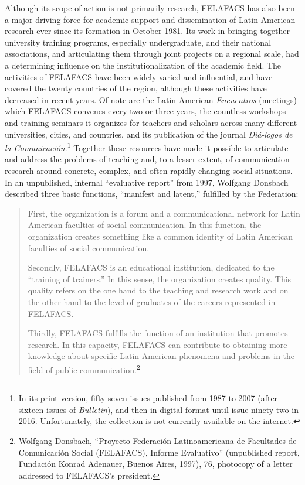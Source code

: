 \documentclass{tufte-handout}
\begin{document}
Although its scope of action is not primarily research, FELAFACS has
also been a major driving force for academic support and dissemination
of Latin American research ever since its formation in October 1981. Its
work in bringing together university training programs, especially
undergraduate, and their national associations, and articulating them
through joint projects on a regional scale, had a determining influence
on the institutionalization of the academic field. The activities of
FELAFACS have been widely varied and influential, and have covered the
twenty countries of the region, although these activities have decreased
in recent years. Of note are the Latin American \emph{Encuentros}
(meetings) which FELAFACS convenes every two or three years, the
countless workshops and training seminars it organizes for teachers and
scholars across many different universities, cities, and countries, and
its publication of the journal \emph{Diá-logos de la
Comunicación}.\footnote{In its print version, fifty-seven issues
  published from 1987 to 2007 (after sixteen issues of \emph{Bulletin}),
  and then in digital format until issue ninety-two in 2016.
  Unfortunately, the collection is not currently available on the
  internet.} Together these resources have made it possible to
articulate and address the problems of teaching and, to a lesser extent,
of communication research around concrete, complex, and often rapidly
changing social situations. In an unpublished, internal ``evaluative
report'' from 1997, Wolfgang Donsbach described three basic functions,
``manifest and latent,'' fulfilled by the Federation:

\begin{quote}
First, the organization is a forum and a communicational network for
Latin American faculties of social communication. In this function, the
organization creates something like a common identity of Latin American
faculties of social communication.

Secondly, FELAFACS is an educational institution, dedicated to the
``training of trainers.'' In this sense, the organization creates
quality. This quality refers on the one hand to the teaching and
research work and on the other hand to the level of graduates of the
careers represented in FELAFACS.

Thirdly, FELAFACS fulfills the function of an institution that promotes
research. In this capacity, FELAFACS can contribute to obtaining more
knowledge about specific Latin American phenomena and problems in the
field of public communication.\footnote{Wolfgang Donsbach, ``Proyecto
  Federación Latinoamericana de Facultades de Comunicación Social
  (FELAFACS), Informe Evaluativo'' (unpublished report, Fundación Konrad
  Adenauer, Buenos Aires, 1997), 76, photocopy of a letter addressed to
  FELAFACS's president.}
\end{quote}
\end{document}

